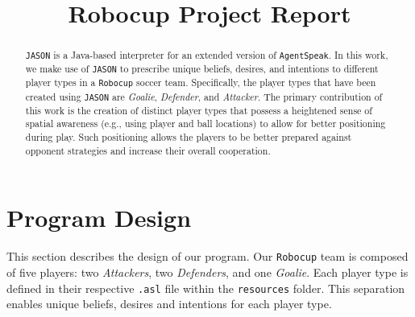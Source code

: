 \documentclass[conference]{IEEEtran}
\begin{document}
\title{
Robocup Project Report
}

\author{
\and
{}
\and
{}
}

\maketitle

\begin{abstract}
\texttt{JASON} is a Java-based interpreter for an extended version of \texttt{AgentSpeak}. In this work, we make use of \texttt{JASON} to prescribe unique beliefs, desires, and intentions to different player types in a \texttt{Robocup} soccer team. Specifically, the player types that have been created using \texttt{JASON} are \textit{Goalie}, \textit{Defender}, and \textit{Attacker}. The primary contribution of this work is the creation of distinct player types that possess a heightened sense of spatial awareness (e.g., using player and ball locations) to allow for better positioning during play. Such positioning allows the players to be better prepared against opponent strategies and increase their overall cooperation.
\end{abstract}


\section{Program Design}

This section describes the design of our program. Our \texttt{Robocup} team is composed of five players: two \textit{Attackers}, two \textit{Defenders}, and one \textit{Goalie}. Each player type is defined in their respective \texttt{.asl} file within the \texttt{resources} folder. This separation enables unique beliefs, desires and intentions for each player type. 
\end{document}
